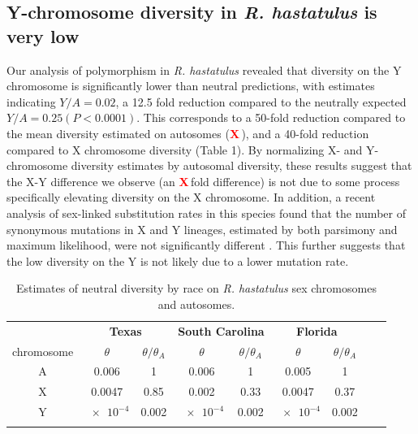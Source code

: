 \documentclass[9pt,twocolumn,twoside]{gsajnl}
\newcommand{\X}{\textcolor{red}{\bf X\,}}
\begin{document}
\subsection*{Y-chromosome diversity in \textit{R. hastatulus} is very low}
Our analysis of polymorphism in \textit{R. hastatulus} revealed that diversity on the Y chromosome is significantly lower than neutral predictions, with estimates indicating $Y/A=0.02$, a 12.5 fold reduction compared to the neutrally expected $Y/A = 0.25 (P<0.0001)$. This corresponds to a 50-fold reduction compared to the mean diversity estimated on autosomes (\X), and a 40-fold reduction compared to X chromosome diversity (Table 1). By normalizing X- and Y-chromosome diversity estimates by autosomal diversity, these results suggest that the X-Y difference we observe (an \X fold difference) is not due to some process specifically elevating diversity on the X chromosome. In addition, a recent analysis of sex-linked substitution rates in this species found that the number of synonymous mutations in X and Y lineages, estimated by both parsimony and maximum likelihood, were not significantly different \citep{hough2014}. This further suggests that the low diversity on the Y is not likely due to a lower mutation rate. 


\begin{table}
\centering
\caption{Estimates of neutral diversity by race on \textit{R. hastatulus} sex chromosomes and autosomes.}
\begin{tabular}{ccccccccc}
\textbf{} & \multicolumn{2}{c}{\textbf{Texas}} & \multicolumn{2}{c}{\textbf{South Carolina}} & \multicolumn{2}{c}{\textbf{Florida}} \\
chromosome & $\theta$ & $\theta/\theta_{A}$ & $\theta$ & $\theta/\theta_{A}$ & $\theta$ & $\theta/\theta_{A}$ \\
\midrule
A & 0.006 & 1 & 0.006 & 1 & 0.005 & 1 \\    
X & 0.0047 & 0.85 & 0.002 & 0.33 & 0.0047 & 0.37 \\ 
Y & $\num{e-4}$ & 0.002 & $\num{e-4}$ & 0.002 & $\num{e-4}$ & 0.002 \\ 
\addlinespace

\bottomrule
\end{tabular}

\end{table}
\end{document}
